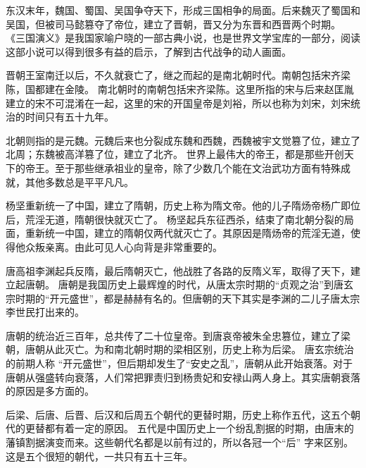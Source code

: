 \documentclass[avery5371,grid]{flashcards}
\begin{document}
{东汉末年，魏国、蜀国、吴国争夺天下，形成三国相争的局面。后来魏灭了蜀国和吴国，但被司马懿篡夺了帝位，建立了晋朝，晋又分为东晋和西晋两个时期。} %
{《三国演义》是我国家喻户晓的一部古典小说，也是世界文学宝库的一部分，阅读这部小说可以得到很多有益的启示，了解到古代战争的动人画面。} %

{晋朝王室南迁以后，不久就衰亡了，继之而起的是南北朝时代。南朝包括宋齐梁陈，国都建在金陵。} %
{南北朝时的南朝包括宋齐梁陈。这里所指的宋与后来赵匡胤建立的宋不可混淆在一起，这里的宋的开国皇帝是刘裕，所以也称为刘宋，刘宋统治的时间只有五十九年。} %

{北朝则指的是元魏。元魏后来也分裂成东魏和西魏，西魏被宇文觉篡了位，建立了北周；东魏被高洋篡了位，建立了北齐。} %
{世界上最伟大的帝王，都是那些开创天下的帝王。至于那些继承祖业的皇帝，除了少数几个能在文治武功方面有特殊成就，其他多数总是平平凡凡。} %

{杨坚重新统一了中国，建立了隋朝，历史上称为隋文帝。他的儿子隋炀帝杨广即位后，荒淫无道，隋朝很快就灭亡了。} %
{杨坚起兵东征西杀，结束了南北朝分裂的局面，重新统一中国，建立的隋朝仅两代就灭亡了。其原因是隋炀帝的荒淫无道，使得他众叛亲离。由此可见人心向背是非常重要的。} %

{唐高祖李渊起兵反隋，最后隋朝灭亡，他战胜了各路的反隋义军，取得了天下，建立起唐朝。} %
{唐朝是我国历史上最辉煌的时代，从唐太宗时期的“贞观之治”到唐玄宗时期的“开元盛世”，都是赫赫有名的。但唐朝的天下其实是李渊的二儿子唐太宗李世民打出来的。} %

{唐朝的统治近三百年，总共传了二十位皇帝。到唐哀帝被朱全忠篡位，建立了梁朝，唐朝从此灭亡。为和南北朝时期的梁相区别，历史上称为后梁。} %
{唐玄宗统治的前期人称 “开元盛世”，但后期却发生了“安史之乱”，唐朝从此开始衰落。对于唐朝从强盛转向衰落，人们常把罪责归到杨贵妃和安禄山两人身上。其实唐朝衰落的原因是多方面的。} %

{后梁、后唐、后晋、后汉和后周五个朝代的更替时期，历史上称作五代，这五个朝代的更替都有着一定的原因。} %
{五代是中国历史上一个纷乱割据的时期，由唐末的藩镇割据演变而来。这些朝代名都是以前有过的，所以各冠一个“后” 字来区别。这是五个很短的朝代，一共只有五十三年。} %
\end{document}

